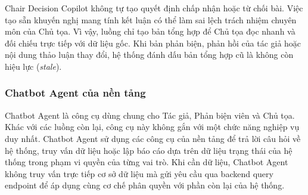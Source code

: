 Chair Decision Copilot không tự tạo quyết định chấp nhận hoặc từ chối bài. Việc tạo sẵn khuyến nghị mang tính kết luận có thể làm sai lệch trách nhiệm chuyên môn của Chủ tọa. Vì vậy, luồng chỉ tạo bản tổng hợp để Chủ tọa đọc nhanh và đối chiếu trực tiếp với dữ liệu gốc. Khi bản phản biện, phản hồi của tác giả hoặc nội dung thảo luận thay đổi, hệ thống đánh dấu bản tổng hợp cũ là không còn hiệu lực (\textit{stale}).

\subsubsection{Chatbot Agent của nền tảng}

Chatbot Agent là công cụ dùng chung cho Tác giả, Phản biện viên và Chủ tọa. Khác với các luồng còn lại, công cụ này không gắn với một chức năng nghiệp vụ duy nhất. Chatbot Agent sử dụng các công cụ của nền tảng để trả lời câu hỏi về hệ thống, truy vấn dữ liệu hoặc lập báo cáo dựa trên dữ liệu trạng thái của hệ thống trong phạm vi quyền của từng vai trò. Khi cần dữ liệu, Chatbot Agent không truy vấn trực tiếp cơ sở dữ liệu mà gửi yêu cầu qua backend query endpoint để áp dụng cùng cơ chế phân quyền với phần còn lại của hệ thống.

